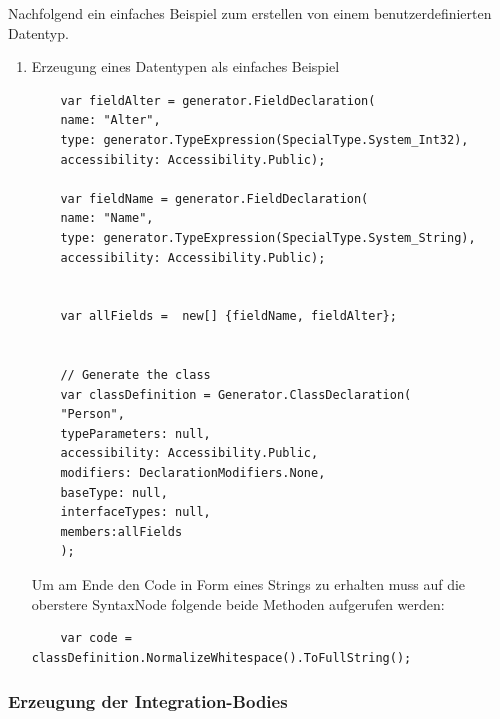 Nachfolgend ein einfaches Beispiel zum erstellen von einem
benutzerdefinierten Datentyp.

\begin{enumerate}
	\item Erzeugung eines Datentypen als einfaches Beispiel
	\label{sec:orgheadline42}
	
	\begin{verbatim}
	var fieldAlter = generator.FieldDeclaration(
	name: "Alter",
	type: generator.TypeExpression(SpecialType.System_Int32),
	accessibility: Accessibility.Public);
	
	var fieldName = generator.FieldDeclaration(
	name: "Name",
	type: generator.TypeExpression(SpecialType.System_String),
	accessibility: Accessibility.Public);
	
	
	var allFields =  new[] {fieldName, fieldAlter};
	
	
	// Generate the class
	var classDefinition = Generator.ClassDeclaration(
	"Person", 
	typeParameters: null,
	accessibility: Accessibility.Public,
	modifiers: DeclarationModifiers.None,
	baseType: null,
	interfaceTypes: null,
	members:allFields
	);
	\end{verbatim}
	
	Um am Ende den Code in Form eines Strings zu erhalten muss auf die oberstere
	SyntaxNode folgende beide Methoden aufgerufen werden:
	
	\begin{verbatim}
	var code = classDefinition.NormalizeWhitespace().ToFullString();
	\end{verbatim}
\end{enumerate}

\subsubsection{Erzeugung der Integration-Bodies}
\label{sec:orgheadline51}

